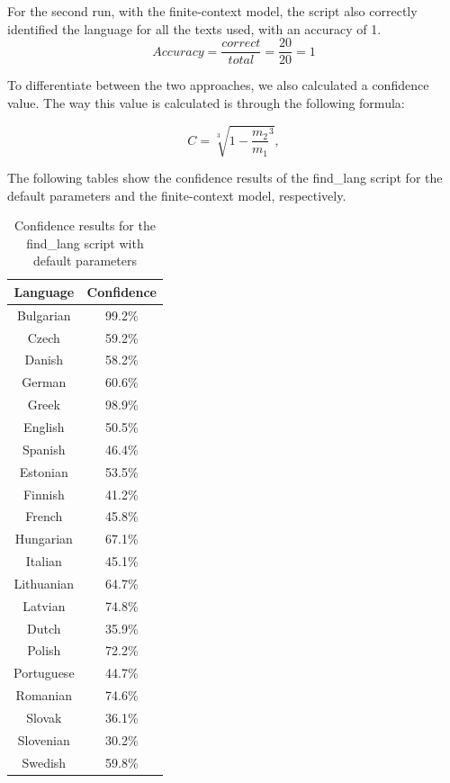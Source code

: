 \documentclass{article}
\begin{document}
For the second run, with the finite-context model, the script also correctly identified the language for all the texts used, with an accuracy of 1.
\begin{equation}
    \label{eq:find_lang_finite_context_accuracy}
    Accuracy = \frac{correct}{total} = \frac{20}{20} = 1
\end{equation}

To differentiate between the two approaches, we also calculated a confidence value. The way this value is calculated is through the following formula:

$$
C = \sqrt[3]{1 - \frac{m_2}{m_1}^3},
$$

The following tables show the confidence results of the find_lang script for the default parameters and the finite-context model, respectively.


\begin{table}[H]
    \centering
    \begin{tabular}{|c|c|}
        \hline
        Language & Confidence \\
        \hline
        Bulgarian & 99.2\% \\
        Czech & 59.2\% \\
        Danish & 58.2\% \\
        German & 60.6\% \\
        Greek & 98.9\% \\
        English & 50.5\% \\
        Spanish & 46.4\% \\
        Estonian & 53.5\% \\
        Finnish & 41.2\% \\
        French & 45.8\% \\
        Hungarian & 67.1\% \\
        Italian & 45.1\% \\
        Lithuanian & 64.7\% \\
        Latvian & 74.8\% \\
        Dutch & 35.9\% \\
        Polish & 72.2\% \\
        Portuguese & 44.7\% \\
        Romanian & 74.6\% \\
        Slovak & 36.1\% \\
        Slovenian & 30.2\% \\
        Swedish & 59.8\% \\
        \hline
    \end{tabular}
    \caption{Confidence results for the find_lang script with default parameters}
    \label{tab:find_lang_default_confidence}
\end{table}
\end{document}
